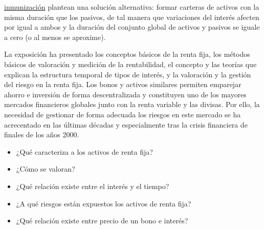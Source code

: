 \documentclass{nuevotema}
\begin{document}
\underline{inmunización} plantean una solución alternativa: formar carteras de activos con la misma duración que los pasivos, de tal manera que variaciones del interés afecten por igual a ambos y la duración del conjunto global de activos y pasivos se iguale a cero (o al menos se aproxime). 

La exposición ha presentado los conceptos básicos de la renta fija, los métodos básicos de valoración y medición de la rentabilidad, el concepto y las teorías que explican la estructura temporal de tipos de interés, y la valoración y la gestión del riesgo en la renta fija. Los bonos y activos similares permiten emparejar ahorro e inversión de forma descentralizada y constituyen uno de los mayores mercados financieros globales junto con la renta variable y las divisas. Por ello, la necesidad de gestionar de forma adecuada los riesgos en este mercado se ha acrecentado en las últimas décadas y especialmente tras la crisis financiera de finales de los años 2000. 


\begin{itemize}
    \item ¿Qué caracteriza a los activos de renta fija?
    \item ¿Cómo se valoran?
    \item ¿Qué relación existe entre el interés y el tiempo?
    \item ¿A qué riesgos están expuestos los activos de renta fija?
    \item ¿Qué relación existe entre precio de un bono e interés?
\end{itemize}
\end{document}

